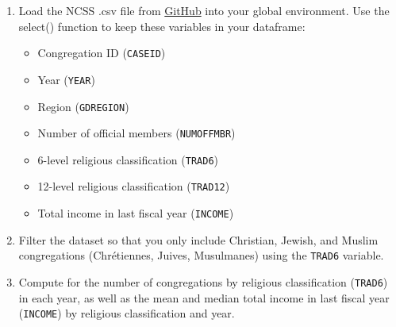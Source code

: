 \documentclass[12pt,letterpaper]{article}
\begin{document}
\begin{enumerate}
\item Load the NCSS .csv file from \href{https://raw.githubusercontent.com/ASDS-TCD/DataViz_2026/refs/heads/main/datasets/NCSS_v1.csv}{GitHub} into your global environment. Use the select() function to keep these variables in your dataframe:
\begin{itemize}
	\item Congregation ID (\texttt{CASEID})
	\item Year (\texttt{YEAR})
	\item Region (\texttt{GDREGION})
	\item Number of official members (\texttt{NUMOFFMBR})
	\item 6-level religious classification (\texttt{TRAD6})
	\item 12-level religious classification (\texttt{TRAD12})
	\item Total income in last fiscal year (\texttt{INCOME})
\end{itemize}
  
\item Filter the dataset so that you only include Christian, Jewish, and Muslim congregations (Chrétiennes, Juives, Musulmanes) using the \texttt{TRAD6} variable.
  
\item Compute for the number of congregations by religious classification (\texttt{TRAD6}) in each year, as well as the mean and median total income in last fiscal year (\texttt{INCOME}) by religious classification and year.

\end{enumerate}
\end{document}
